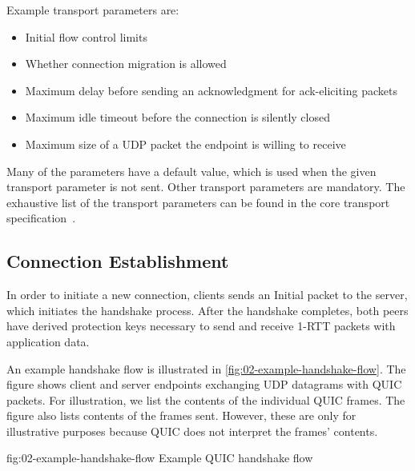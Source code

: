 Example transport parameters are:

\begin{itemize}

  \item Initial flow control limits

  \item Whether connection migration is allowed

  \item Maximum delay before sending an acknowledgment for ack-eliciting packets

  \item Maximum idle timeout before the connection is silently closed

  \item Maximum size of a UDP packet the endpoint is willing to receive

\end{itemize}

Many of the parameters have a default value, which is used when the given transport parameter is not
sent. Other transport parameters are mandatory. The exhaustive list of the transport parameters can be found in the core transport specification~\cite[Section~7.4]{draft-ietf-quic-transport}.

\subsection{Connection Establishment}

In order to initiate a new connection, clients sends an Initial packet to the server, which
initiates the handshake process. After the handshake completes, both peers have derived protection
keys necessary to send and receive 1-RTT packets with application data.

An example handshake flow is illustrated in \autoref{fig:02-example-handshake-flow}. The figure
shows client and server endpoints exchanging UDP datagrams with QUIC packets. For illustration, we
list the contents of the individual QUIC frames. The figure also lists contents of the \CRYPTO{}
frames sent. However, these are only for illustrative purposes because QUIC does not interpret the
\CRYPTO{} frames' contents.

\begin{myFigure} {fig:02-example-handshake-flow} {Example QUIC handshake flow}

  \resizebox{\linewidth}{!}{}

\end{myFigure}

